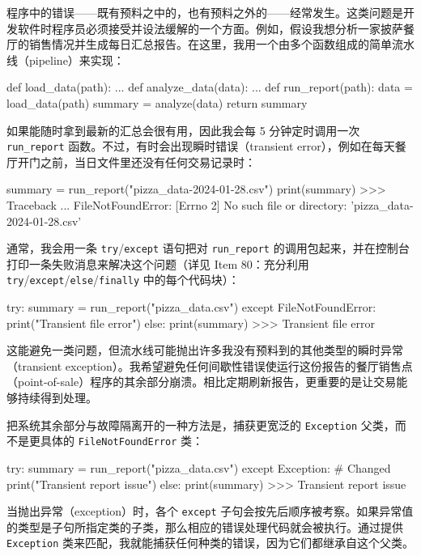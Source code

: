 程序中的错误——既有预料之中的，也有预料之外的——经常发生。这类问题是开发软件时程序员必须接受并设法缓解的一个方面。例如，假设我想分析一家披萨餐厅的销售情况并生成每日汇总报告。在这里，我用一个由多个函数组成的简单流水线（pipeline）来实现：

\begin{codebox}[python]
def load_data(path):
    ...
def analyze_data(data):
    ...
def run_report(path):
    data = load_data(path)
    summary = analyze(data)
    return summary
\end{codebox}

如果能随时拿到最新的汇总会很有用，因此我会每 5 分钟定时调用一次 \texttt{run\_report} 函数。不过，有时会出现瞬时错误（transient error），例如在每天餐厅开门之前，当日文件里还没有任何交易记录时：

\begin{codebox}[python]
summary = run_report("pizza_data-2024-01-28.csv")
print(summary)
>>>
Traceback ...
FileNotFoundError: [Errno 2] No such file or directory:
'pizza_data-2024-01-28.csv'
\end{codebox}

通常，我会用一条 \texttt{try}/\texttt{except} 语句把对 \texttt{run\_report} 的调用包起来，并在控制台打印一条失败消息来解决这个问题（详见 Item 80：充分利用 \texttt{try}/\texttt{except}/\texttt{else}/\texttt{finally} 中的每个代码块）：

\begin{codebox}[python]
try:
    summary = run_report("pizza_data.csv")
except FileNotFoundError:
    print("Transient file error")
else:
    print(summary)
>>>
Transient file error
\end{codebox}

这能避免一类问题，但流水线可能抛出许多我没有预料到的其他类型的瞬时异常（transient exception）。我希望避免任何间歇性错误使运行这份报告的餐厅销售点（point-of-sale）程序的其余部分崩溃。相比定期刷新报告，更重要的是让交易能够持续得到处理。

把系统其余部分与故障隔离开的一种方法是，捕获更宽泛的 \texttt{Exception} 父类，而不是更具体的 \texttt{FileNotFoundError} 类：

\begin{codebox}[python]
try:
    summary = run_report("pizza_data.csv")
except Exception:  # Changed
    print("Transient report issue")
else:
    print(summary)
>>>
Transient report issue
\end{codebox}

当抛出异常（exception）时，各个 \texttt{except} 子句会按先后顺序被考察。如果异常值的类型是子句所指定类的子类，那么相应的错误处理代码就会被执行。通过提供 \texttt{Exception} 类来匹配，我就能捕获任何种类的错误，因为它们都继承自这个父类。

